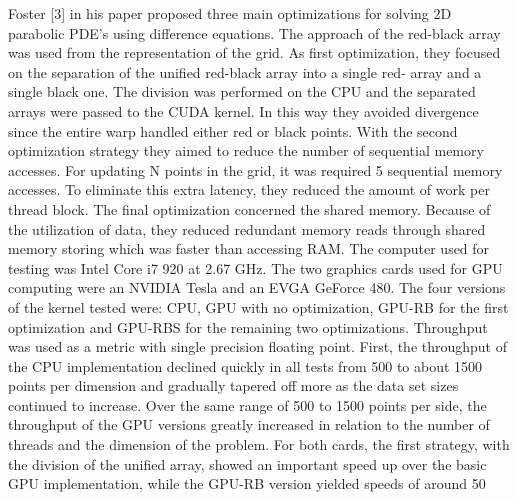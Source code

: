 Foster [3] in his paper proposed three main optimizations for solving 2D parabolic PDE’s using difference equations. The approach of the red-black array was used from the representation of the grid. As first optimization, they focused on the separation of the unified red-black array into a single red- array and a single black one. The division was performed on the CPU and the separated arrays were passed to the CUDA kernel. In this way they avoided divergence since the entire warp handled either red or black points. With the second optimization strategy they aimed to reduce the number of sequential memory accesses. For updating N points in the grid, it was required 5 sequential memory accesses. To eliminate this extra latency, they reduced the amount of work per thread block. The final optimization concerned the shared memory. Because of the utilization of data, they reduced redundant memory reads through shared memory storing which was faster than accessing RAM. The computer used for testing was Intel Core i7 920 at 2.67 GHz. The two graphics cards used for GPU computing were an NVIDIA Tesla and an EVGA GeForce 480. The four versions of the kernel tested were: CPU, GPU with no optimization, GPU-RB for the first optimization and GPU-RBS for the remaining two optimizations. Throughput was used as a metric with single precision floating point. First, the throughput of the CPU implementation declined quickly in all tests from 500 to about 1500 points per dimension and gradually tapered off more as the data set sizes continued to increase. Over the same range of 500 to 1500 points per side, the throughput of the GPU versions greatly increased in relation to the number of threads and the dimension of the problem. For both cards, the first strategy, with the division of the unified array, showed an important speed up over the basic GPU implementation, while the GPU-RB version yielded speeds of around 50%
